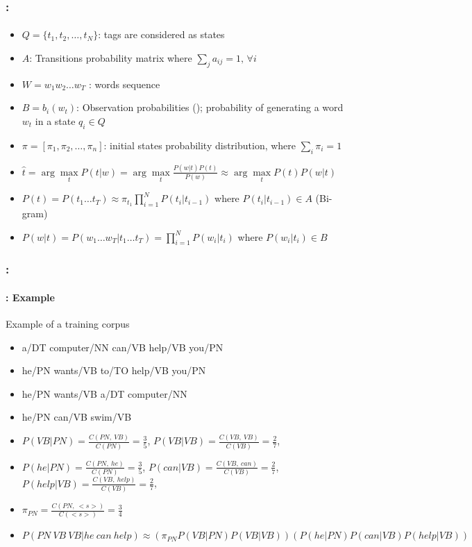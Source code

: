 \documentclass[xcolor=table]{beamer}
\begin{document}
\begin{frame}[fragile]
	\frametitle{\insertshortsubtitle: \insertsection}
	\framesubtitle{\insertsubsection}

	\begin{itemize}
		\item $Q = \{t_1, t_2, \ldots, t_N\}$: tags are considered as states
		\item $A$: Transitions probability matrix where $\sum_j a_{ij} = 1,\, \forall i$
		\item $W = w_1 w_2 \ldots w_T$ : words sequence
		\item $B = b_i(w_t)$: Observation probabilities (); probability of generating a word $w_t$ in a state $q_i \in Q$
		\item $\pi = [\pi_1, \pi_2, \ldots, \pi_n ]$: initial states probability distribution, where $\sum_i \pi_i = 1$
		
		\item $\hat{t} = \arg\max\limits_t P(t | w) = \arg\max\limits_t \frac{P(w|t) P(t)}{P(w)} \approx \arg\max\limits_t P(t) P(w|t)$
		\item $P(t) = P(t_1 \ldots t_T) \approx \pi_{t_1} \prod\limits_{i=1}^N P(t_i|t_{i-1}) $ where $P(t_i|t_{i-1}) \in A$ (Bi-gram) 
		\item $P(w|t) = P(w_1 \ldots w_T|t_1 \ldots t_T) = \prod\limits_{i=1}^N P(w_i|t_i) $ where $P(w_i|t_i) \in B$
	\end{itemize}

\end{frame}

\begin{frame}
	\frametitle{\insertshortsubtitle: \insertsection}
	\framesubtitle{\insertsubsection: Example}

	\begin{exampleblock}{Example of a training corpus}
		\begin{itemize}
			\item a/DT computer/NN can/VB help/VB you/PN
			\item he/PN wants/VB to/TO help/VB you/PN
			\item he/PN wants/VB a/DT computer/NN
			\item he/PN can/VB swim/VB
		\end{itemize}
	\end{exampleblock}
	
	\begin{itemize}
		\item $P(VB | PN) = \frac{C(PN,\ VB)}{C(PN)} = \frac{3}{5}$, 
			  $P(VB | VB) = \frac{C(VB,\ VB)}{C(VB)} = \frac{2}{7}$,
		\item $P(he | PN) = \frac{C(PN,\ he)}{C(PN)} = \frac{3}{5}$,
		      $P(can | VB) = \frac{C(VB,\ can)}{C(VB)} = \frac{2}{7}$,
			  $P(help | VB) = \frac{C(VB,\ help)}{C(VB)} = \frac{2}{7}$,
		\item $\pi_{PN} = \frac{C(PN,\ <s>)}{C(<s>)} = \frac{3}{4} $
		\item $P(PN\ VB\ VB | he\ can\ help) \approx (\pi_{PN} P(VB | PN) P(VB | VB)) (P(he | PN) P(can | VB) P(help | VB)) $
	\end{itemize}

\end{frame}
\end{document}
